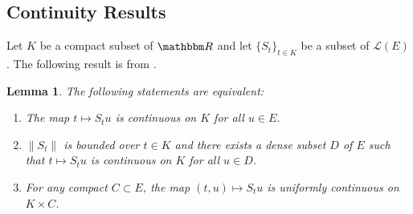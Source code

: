 \documentclass[12pt, reqno]{amsart}
\newcommand{\1}{\mathbbm 1}
\newcommand{\lL}{\mathcal L}
\newcommand{\RR}{\mathbbm R}
\theoremstyle{plain}
\newtheorem{lemma}[theorem]{Lemma}
\theoremstyle{definition}
\begin{document}
\subsection{Continuity Results}


Let $K$ be a compact subset of $\RR$ and let $\{S_t\}_{t \in K}$ be a subset of
$\lL(E)$.  The following result is from \cite{engel2006short}.

\begin{lemma}\label{l:contin}
    The following statements are equivalent:
    \begin{enumerate}
        \item The map $t \mapsto S_t u$ is continuous on $K$ for all $u \in E$.
        \item $\|S_t\|$ is bounded over $t \in K$ and there exists a dense subset
            $D$ of $E$ such that $t \mapsto S_t u$ is continuous on $K$ for all $u \in D$.
        \item For any compact $C \subset E$, the map $(t, u) \mapsto S_t u$ is
            uniformly continuous on $K \times C$.
    \end{enumerate}
\end{lemma}
\end{document}
